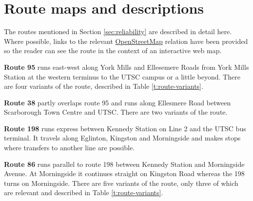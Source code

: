 \documentclass{article}
\begin{document}
\section{Route maps and descriptions}\label{appendix:route_descriptions}

	The routes mentioned in Section \ref{sec:reliability} are described in detail here. Where possible, links to the relevant \href{http://www.openstreetmap.org}{OpenStreetMap} relation have been provided so the reader can see the route in the context of an interactive web map. 

	\textbf{Route 95} runs east-west along York Mills and Ellesemere Roads from York Mills Station at the western terminus to the UTSC campus or a little beyond. There are four variants of the route, described in Table \ref{t:route-variants}. 
	
	\textbf{Route 38} partly overlaps route 95 and runs along Ellesmere Road between Scarborough Town Centre and UTSC. There are two variants of the route. 
	
	\textbf{Route 198} runs express between Kennedy Station on Line 2 and the UTSC bus terminal. It travels along Eglinton, Kingston and Morningside and makes stops where transfers to another line are possible. 
	
	\textbf{Route 86} runs parallel to route 198 between Kennedy Station and Morningside Avenue. At Morningside it continues straight on Kingston Road whereas the 198 turns on Morningside. There are five variants of the route, only three of which are relevant and described in Table \ref{t:route-variants}.
	
\end{document}
